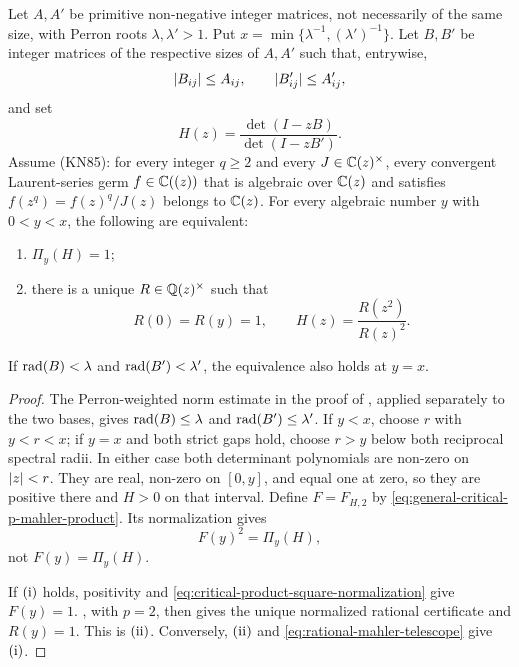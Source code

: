 \begin{theorem}
\label{thm:determinant-boundary-lifting}
Let \(A,A'\) be primitive non-negative integer matrices, not necessarily of
the same size, with Perron roots \(\lambda,\lambda'>1\).
Put \(x=\min\{\lambda^{-1},(\lambda')^{-1}\}\).  Let \(B,B'\) be integer
matrices of the respective sizes of \(A,A'\) such that, entrywise,
\[
 \lvert B_{ij} \rvert\le A_{ij},
 \qquad \lvert B'_{ij} \rvert\le A'_{ij},
\]
and set
\[
 H(z)=\frac{\det(I-zB)}{\det(I-zB')}.
\]
Assume \textup{(KN85)}: for every integer \(q\ge2\) and every
\(J\in\mathbb{C}(z)^\times\), every convergent Laurent-series germ
\(f\in\mathbb{C}((z))\) that is algebraic over \(\mathbb{C}(z)\) and satisfies
\(f(z^q)=f(z)^q/J(z)\) belongs to \(\mathbb{C}(z)\).
For every algebraic number \(y\) with \(0<y<x\), the following are
equivalent:
\begin{enumerate}[label=\textup{(\roman*)},leftmargin=*]
 \item \(\Pi_y(H)=1\);
 \item there is a unique \(R\in\mathbb{Q}(z)^\times\) such that
 \[
  R(0)=R(y)=1,
  \qquad H(z)=\frac{R(z^2)}{R(z)^2}.
 \]
\end{enumerate}
If \(\operatorname{rad}(B)<\lambda\) and \(\operatorname{rad}(B')<\lambda'\), the equivalence also
holds at \(y=x\).
\end{theorem}

\begin{proof}
The Perron-weighted norm estimate in the proof of
, applied separately to the two bases,
gives \(\operatorname{rad}(B)\le\lambda\) and \(\operatorname{rad}(B')\le\lambda'\).  If \(y<x\), choose
\(r\) with \(y<r<x\); if \(y=x\) and both strict gaps hold, choose \(r>y\)
below both reciprocal spectral radii.  In either case both determinant
polynomials are non-zero on \(\lvert z \rvert<r\).  They are real, non-zero on
\([0,y]\), and equal one at zero, so they are positive there and \(H>0\) on
that interval.  Define \(F=F_{H,2}\) by
\eqref{eq:general-critical-p-mahler-product}.  Its normalization gives
\begin{equation}\label{eq:critical-product-square-normalization}
 F(y)^2=\Pi_y(H),
\end{equation}
not \(F(y)=\Pi_y(H)\).

If \(\textup{(i)}\) holds, positivity and
\eqref{eq:critical-product-square-normalization} give \(F(y)=1\).
, with \(p=2\), then gives the
unique normalized rational certificate and \(R(y)=1\).  This is
\(\textup{(ii)}\).  Conversely, \(\textup{(ii)}\) and
\eqref{eq:rational-mahler-telescope} give \(\textup{(i)}\).
\end{proof}

